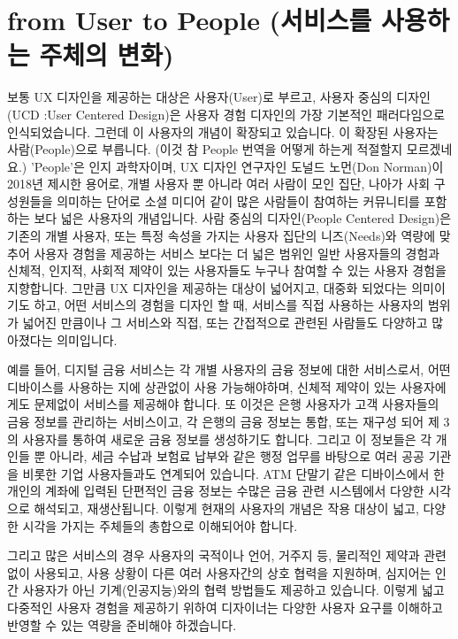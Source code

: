 \documentclass[
  letterpaper,
]{book}
\begin{document}
\section{from User to People (서비스를 사용하는 주체의
변화)}\label{from-user-to-people-uxc11cuxbe44uxc2a4uxb97c-uxc0acuxc6a9uxd558uxb294-uxc8fcuxccb4uxc758-uxbcc0uxd654}

보통 UX 디자인을 제공하는 대상은 사용자(User)로 부르고, 사용자 중심의
디자인(UCD :User Centered Design)은 사용자 경험 디자인의 가장 기본적인
패러다임으로 인식되었습니다. 그런데 이 사용자의 개념이 확장되고
있습니다. 이 확장된 사용자는 사람(People)으로 부릅니다. (이것 참 People
번역을 어떻게 하는게 적절할지 모르겠네요.) 'People'은 인지 과학자이며,
UX 디자인 연구자인 도널드 노먼(Don Norman)이 2018년 제시한 용어로, 개별
사용자 뿐 아니라 여러 사람이 모인 집단, 나아가 사회 구성원들을 의미하는
단어로 소셜 미디어 같이 많은 사람들이 참여하는 커뮤니티를 포함하는 보다
넓은 사용자의 개념입니다. 사람 중심의 디자인(People Centered Design)은
기존의 개별 사용자, 또는 특정 속성을 가지는 사용자 집단의 니즈(Needs)와
역량에 맞추어 사용자 경험을 제공하는 서비스 보다는 더 넓은 범위인 일반
사용자들의 경험과 신체적, 인지적, 사회적 제약이 있는 사용자들도 누구나
참여할 수 있는 사용자 경험을 지향합니다. 그만큼 UX 디자인을 제공하는
대상이 넓어지고, 대중화 되었다는 의미이기도 하고, 어떤 서비스의 경험을
디자인 할 때, 서비스를 직접 사용하는 사용자의 범위가 넓어진 만큼이나 그
서비스와 직접, 또는 간접적으로 관련된 사람들도 다양하고 많아졌다는
의미입니다.

예를 들어, 디지털 금융 서비스는 각 개별 사용자의 금융 정보에 대한
서비스로서, 어떤 디바이스를 사용하는 지에 상관없이 사용 가능해야하며,
신체적 제약이 있는 사용자에게도 문제없이 서비스를 제공해야 합니다. 또
이것은 은행 사용자가 고객 사용자들의 금융 정보를 관리하는 서비스이고, 각
은행의 금융 정보는 통합, 또는 재구성 되어 제 3의 사용자를 통하여 새로운
금융 정보를 생성하기도 합니다. 그리고 이 정보들은 각 개인들 뿐 아니라,
세금 수납과 보험료 납부와 같은 행정 업무를 바탕으로 여러 공공 기관을
비롯한 기업 사용자들과도 연계되어 있습니다. ATM 단말기 같은 디바이스에서
한 개인의 계좌에 입력된 단편적인 금융 정보는 수많은 금융 관련 시스템에서
다양한 시각으로 해석되고, 재생산됩니다. 이렇게 현재의 사용자의 개념은
작용 대상이 넓고, 다양한 시각을 가지는 주체들의 총합으로 이해되어야
합니다.

그리고 많은 서비스의 경우 사용자의 국적이나 언어, 거주지 등, 물리적인
제약과 관련 없이 사용되고, 사용 상황이 다른 여러 사용자간의 상호 협력을
지원하며, 심지어는 인간 사용자가 아닌 기계(인공지능)와의 협력 방법들도
제공하고 있습니다. 이렇게 넓고 다중적인 사용자 경험을 제공하기 위하여
디자이너는 다양한 사용자 요구를 이해하고 반영할 수 있는 역량을 준비해야
하겠습니다.
\end{document}
